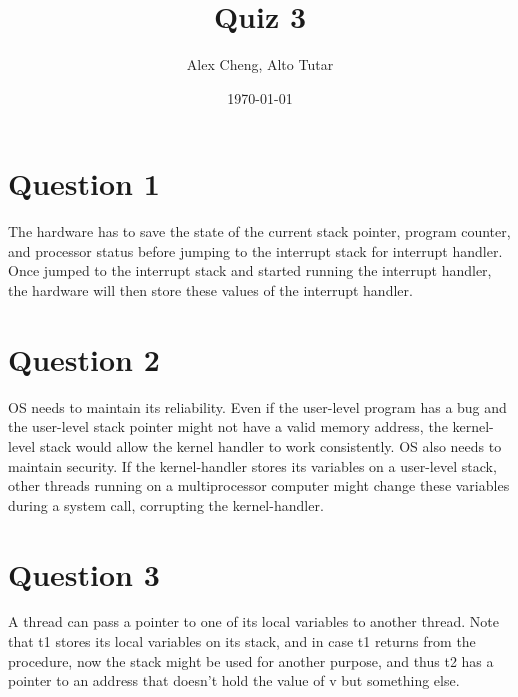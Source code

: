 \documentclass[10pt]{article}
\author{Alex Cheng, Alto Tutar}
\title{Quiz 3}
\date{\today}
\begin{document}
\maketitle
\section{Question 1}
The hardware has to save the state of the current stack pointer, program counter, and processor status before jumping to the interrupt stack for interrupt handler. Once jumped to the interrupt stack and started running the interrupt handler, the hardware will then store these values of the interrupt handler.
\section{Question 2}
OS needs to maintain its reliability. Even if the user-level program has a bug and the user-level stack pointer might not have a valid memory address, the kernel-level stack would allow the kernel handler to work consistently. OS also needs to maintain security. If the kernel-handler stores its variables on a user-level stack, other threads running on a multiprocessor computer might change these variables during a system call, corrupting the kernel-handler. 
\section{Question 3}
A thread can pass a pointer to one of its local variables to another thread. Note that t1 stores its local variables on its stack, and in case t1 returns from the procedure, now the stack might be used for another purpose, and thus t2 has a pointer to an address that doesn’t hold the value of v but something else.
\end{document}
